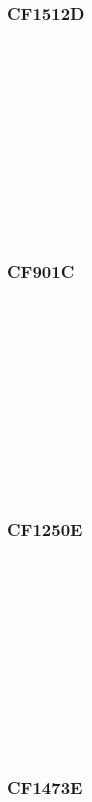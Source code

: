 \subsubsection{CF1512D}

~\\
~\\
~\\
~\\
~\\
~\\
~\\
~\\
~\\
~\\
\subsubsection{CF901C}

~\\
~\\
~\\
~\\
~\\
~\\
~\\
~\\
~\\
~\\
\subsubsection{CF1250E}

~\\
~\\
~\\
~\\
~\\
~\\
~\\
~\\
~\\
~\\
\subsubsection{CF1473E}

~\\
~\\
~\\
~\\
~\\
~\\
~\\
~\\
~\\
~\\
